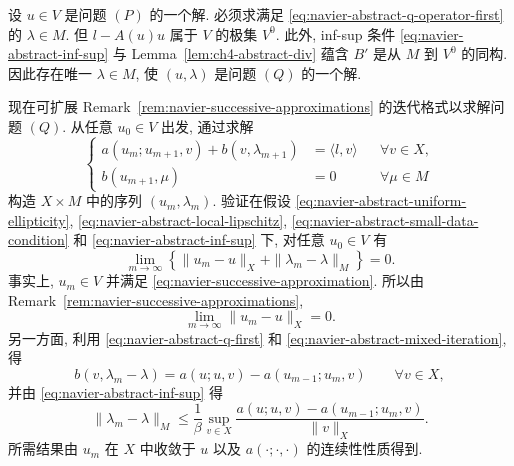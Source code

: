 \begin{Proof}
设 $u\in V$ 是问题 $(P)$ 的一个解. 必须求满足
\eqref{eq:navier-abstract-q-operator-first} 的 $\lambda\in M$.
但 $l-A(u)u$ 属于 $V$ 的极集 $V^0$.
此外, inf-sup 条件 \eqref{eq:navier-abstract-inf-sup} 与
Lemma~\ref{lem:ch4-abstract-div} 蕴含 $B'$ 是从 $M$ 到 $V^0$ 的同构.
因此存在唯一 $\lambda\in M$, 使 $(u,\lambda)$ 是问题 $(Q)$ 的一个解.
\end{Proof}

\setcounter{statement}{2}
\begin{Remark}\label{rem:navier-abstract-mixed-iteration}
现在可扩展 Remark~\ref{rem:navier-successive-approximations} 的迭代格式以求解问题 $(Q)$.
从任意 $u_0\in V$ 出发, 通过求解
\begin{equation}\label{eq:navier-abstract-mixed-iteration}
\left\{
\begin{aligned}
a(u_m;u_{m+1},v)+b(v,\lambda_{m+1})&=\langle l,v\rangle
&&\forall v\in X,\\
b(u_{m+1},\mu)&=0
&&\forall\mu\in M
\end{aligned}
\right.
\end{equation}
构造 $X\times M$ 中的序列 $(u_m,\lambda_m)$.
验证在假设
\eqref{eq:navier-abstract-uniform-ellipticity},
\eqref{eq:navier-abstract-local-lipschitz},
\eqref{eq:navier-abstract-small-data-condition} 和
\eqref{eq:navier-abstract-inf-sup} 下, 对任意 $u_0\in V$ 有
\begin{equation}\label{eq:navier-abstract-mixed-iteration-convergence}
\lim_{m\to\infty}
\left\{\|u_m-u\|_X+\|\lambda_m-\lambda\|_M\right\}=0.
\end{equation}
事实上, $u_m\in V$ 并满足
\eqref{eq:navier-successive-approximation}.
所以由 Remark~\ref{rem:navier-successive-approximations},
\[
\lim_{m\to\infty}\|u_m-u\|_X=0.
\]
另一方面, 利用 \eqref{eq:navier-abstract-q-first} 和
\eqref{eq:navier-abstract-mixed-iteration}, 得
\[
b(v,\lambda_m-\lambda)
=a(u;u,v)-a(u_{m-1};u_m,v)
\qquad\forall v\in X,
\]
并由 \eqref{eq:navier-abstract-inf-sup} 得
\[
\|\lambda_m-\lambda\|_M
\leq\frac1\beta\sup_{v\in X}
\frac{a(u;u,v)-a(u_{m-1};u_m,v)}{\|v\|_X}.
\]
所需结果由 $u_m$ 在 $X$ 中收敛于 $u$ 以及
$a(\cdot;\cdot,\cdot)$ 的连续性性质得到.
\end{Remark}
